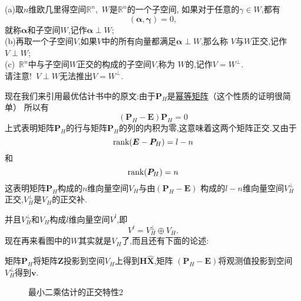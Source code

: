 \documentclass[cn,10pt,citestyle=gb7714-2015,bibstyle=gb7714-2015]{elegantbook}
\begin{document}
    \begin{definition}
        (a)取$n$维欧几里得空间$\mathbb{R}^n$,\ $W$是$\mathbb{R}^n$的一个子空间,
        如果对于任意的$\gamma\in W$,都有
        \[
            (\bm{\alpha},\bm{\gamma})=0,
        \]  
        就称$\bm{\alpha}$和子空间$W$,记作$\bm{\alpha}\perp W$;\\
        (b)再取一个子空间$V$,如果$V$中的所有向量都满足$\bm{\alpha}\perp W$,那么称
        $V$与$W$正交,记作$V\perp W$;\\
        (c)\ $\mathbb{R}^n$中与子空间$W$正交的构成的子空间$V$,称为
        $W$的,记作$V=W^\bot$.\\
        \textcolor{red}{\HandRight}请注意!\ $V\perp W$无法推出$V=W^\bot$.
    \end{definition}
    现在我们来引用最优估计书中的原文:由于$\bm{P}_H$是\uline{幂等矩阵}（这个性质的证明很简单）
    所以有
    \[
        (\bm{P}_H-\bm{E})\bm{P}_H=0  
    \]
    上式表明矩阵$\bm{P}_H$的行与矩阵$\bm{P}_H$的列的内积为零,这意味着这两个矩阵正交.又由于
    \[
        \textup{rank}(\bm{E}-\bm{P}_H)=l-n  
    \]
    和
    \[
        \textup{rank}(\bm{P}_H)=n  
    \]
    这表明矩阵$\bm{P}_H$构成的$n$维向量空间$V_{H}$与由$(\bm{P}_H-\bm{E})$
    构成的$l-n$维向量空间$V_H^\bot$正交,$V_H^\bot$是$V_H$的正交补.

    并且$V_H^\bot$和$V_H$构成$l$维向量空间$V^l$,即
    \[
        V^l=V_H^\bot\oplus V_H.
    \]
    现在再来看图中的$W$其实就是$V_H$了,而且还有下面的论述:
    \begin{shaded}
        矩阵$\bm{P}_H$将矩阵$\bm{Z}$投影到空间$V_H$上得到$\bm{H}\hat{\bm{X}}$,矩阵
    $(\bm{P}_H-\bm{E})$将观测值投影到空间$V_H^\bot$得到$\bm{v}$.
    \end{shaded}
    \begin{figure}[H]
        \centering
        \caption{最小二乘估计的正交特性2}
    \end{figure}
\end{document}
